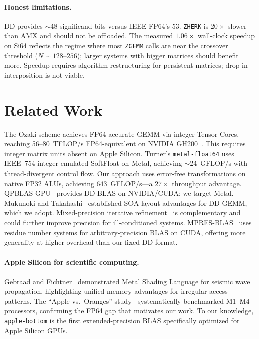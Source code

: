 \documentclass[conference]{IEEEtran}
\newcommand{\ZGEMM}{\texttt{ZGEMM}}
\newcommand{\ZHERK}{\texttt{ZHERK}}
\newcommand{\AB}{\texttt{apple-bottom}}
\begin{document}
\paragraph{Honest limitations.} DD provides ${\sim}$48 significand bits versus IEEE FP64's 53. \ZHERK{} is $20{\times}$ slower than AMX and should not be offloaded. The measured $1.06{\times}$ wall-clock speedup on Si64 reflects the regime where most \ZGEMM{} calls are near the crossover threshold ($N{\sim}128$--$256$); larger systems with bigger matrices should benefit more. Speedup requires algorithm restructuring for persistent matrices; drop-in interposition is not viable.
\section{Related Work}
\label{sec:related}
The Ozaki scheme achieves FP64-accurate GEMM via integer Tensor Cores, reaching 56--80~TFLOP/s FP64-equivalent on NVIDIA GH200~\cite{Ozaki2012,OzakiII2025}. This requires integer matrix units absent on Apple Silicon. Turner's \texttt{metal-float64} uses IEEE~754 integer-emulated SoftFloat on Metal, achieving ${\sim}$24~GFLOP/s with thread-divergent control flow. Our approach uses error-free transformations on native FP32 ALUs, achieving $643$~GFLOP/s---a $27{\times}$ throughput advantage.
QPBLAS-GPU~\cite{QPBLAS-GPU} provides DD BLAS on NVIDIA/CUDA; we target Metal. Mukunoki and Takahashi~\cite{Mukunoki2012} established SOA layout advantages for DD GEMM, which we adopt. Mixed-precision iterative refinement~\cite{Baboulin2009} is complementary and could further improve precision for ill-conditioned systems. MPRES-BLAS~\cite{MPRES-BLAS} uses residue number systems for arbitrary-precision BLAS on CUDA, offering more generality at higher overhead than our fixed DD format.
\paragraph{Apple Silicon for scientific computing.} Gebraad and Fichtner~\cite{Gebraad2023} demonstrated Metal Shading Language for seismic wave propagation, highlighting unified memory advantages for irregular access patterns. The ``Apple vs.\ Oranges'' study~\cite{AppleVsOranges2025} systematically benchmarked M1--M4 processors, confirming the FP64 gap that motivates our work. To our knowledge, \AB{} is the first extended-precision BLAS specifically optimized for Apple Silicon GPUs.
\end{document}
